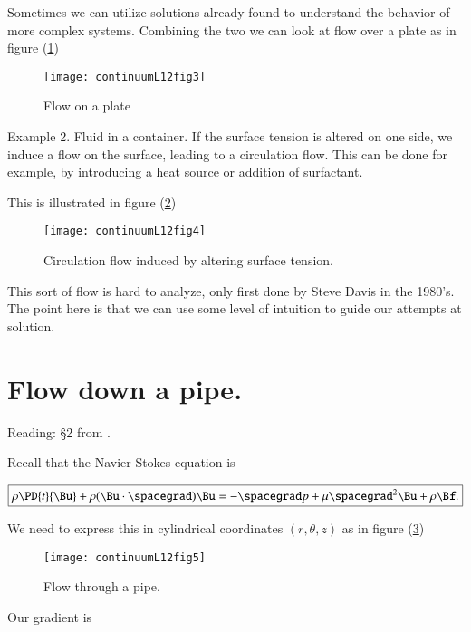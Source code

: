 Sometimes we can utilize solutions already found to understand the behavior of more complex systems.  Combining the two we can look at flow over a plate as in figure (\ref{fig:continuumL12:continuumL12fig3})

\begin{figure}[htp]
   \centering
   \texttt{[image: continuumL12fig3]}
   \caption{Flow on a plate}\label{fig:continuumL12:continuumL12fig3}
\end{figure}

Example 2.  Fluid in a container.  If the surface tension is altered on one side, we induce a flow on the surface, leading to a circulation flow.  This can be done for example, by introducing a heat source or addition of surfactant.

This is illustrated in figure (\ref{fig:continuumL12:continuumL12fig4})
\begin{figure}[htp]
   \centering
   \texttt{[image: continuumL12fig4]}
   \caption{Circulation flow induced by altering surface tension.}\label{fig:continuumL12:continuumL12fig4}
\end{figure}

This sort of flow is hard to analyze, only first done by Steve Davis in the 1980's.  The point here is that we can use some level of intuition to guide our attempts at solution.

\section{Flow down a pipe.}

Reading: \S 2 from \cite{acheson1990elementary}.

Recall that the Navier-Stokes equation is

\begin{equation}\label{eqn:continuumL12:570}
\boxed{
\rho \PD{t}{\Bu} + \rho (\Bu \cdot \spacegrad) \Bu = - \spacegrad p + \mu \spacegrad^2 \Bu + \rho \Bf.
}
\end{equation}

We need to express this in cylindrical coordinates $(r, \theta, z)$ as in figure (\ref{fig:continuumL12:continuumL12fig5})
\begin{figure}[htp]
   \centering
   \texttt{[image: continuumL12fig5]}
   \caption{Flow through a pipe.}\label{fig:continuumL12:continuumL12fig5}
\end{figure}

Our gradient is 

